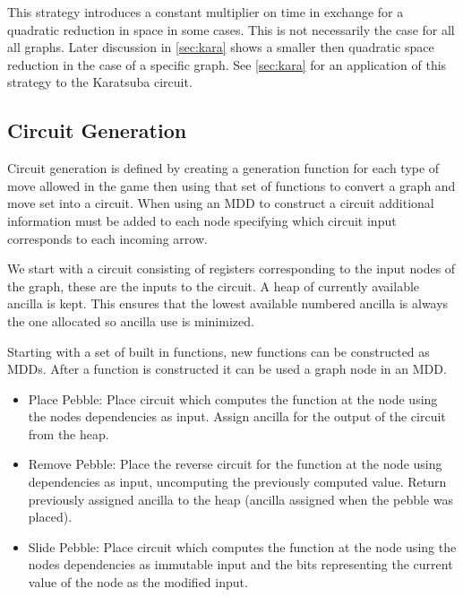 This strategy introduces a constant multiplier on time in exchange for a
quadratic reduction in space in some cases. This is not necessarily the case
for all all graphs. Later discussion in \cref{sec:kara} shows a smaller then
quadratic space reduction in the case of a specific graph. See \cref{sec:kara}
for an application of this strategy to the Karatsuba circuit.

\subsection{Circuit Generation}

Circuit generation is defined by creating a generation function for each type
of move allowed in the game then using that set of functions to convert a graph
and move set into a circuit. When using an MDD to construct a circuit additional
information must be added to each node specifying which circuit input
corresponds to each incoming arrow.

We start with a circuit consisting of registers corresponding to the input
nodes of the graph, these are the inputs to the circuit. A heap
of currently available ancilla is kept. This ensures that the lowest available
numbered ancilla is always the one allocated so ancilla use is minimized.

Starting with a set of built in functions, new functions can be constructed as MDDs.
After a function is constructed it can be used a graph node in an MDD.

\begin{itemize}

    \item Place Pebble: Place circuit which computes the function at the node
	    using the nodes dependencies as input. Assign ancilla for the
	    output of the circuit from the heap.

    \item Remove Pebble: Place the reverse circuit for the function at the node
	    using dependencies as input, uncomputing the previously computed
	    value.  Return previously assigned ancilla to the heap (ancilla
	    assigned when the pebble was placed).

    \item Slide Pebble: Place circuit which computes the function at the node
	    using the nodes dependencies as immutable input and the bits representing the
	    current value of the node as the modified input.

\end{itemize}

